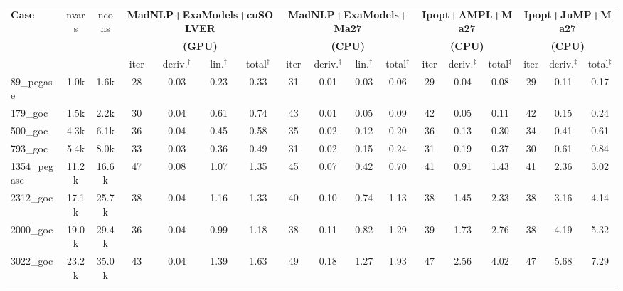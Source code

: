 \begin{tabular}{|l|c|c|cccc|cccc|ccc|ccc|}
  \hline
  \multirow{3}{*}{\textbf{Case}}
  & \multirow{3}{*}{nvars}
  & \multirow{3}{*}{ncons}
  & \multicolumn{4}{c|}{\textbf{MadNLP+ExaModels+cuSOLVER}}
  & \multicolumn{4}{c|}{\textbf{MadNLP+ExaModels+Ma27}}
  & \multicolumn{3}{c|}{\textbf{Ipopt+AMPL+Ma27}}
  & \multicolumn{3}{c|}{\textbf{Ipopt+JuMP+Ma27}}\\
  & & &\multicolumn{4}{c|}{\textbf{(GPU)}} &\multicolumn{4}{c|}{\textbf{(CPU)}} &\multicolumn{3}{c|}{\textbf{(CPU)}}&\multicolumn{3}{c|}{\textbf{(CPU)}}
  \\
  \cline{4-17}
  & & 
  & iter & deriv.$^\dag$ & lin.$^\dag$ & total$^\dag$
  & iter & deriv.$^\dag$ & lin.$^\dag$ & total$^\dag$
  & iter & deriv.$^\ddag$ & total$^\ddag$
  & iter & deriv.$^\ddag$ & total$^\ddag$
  \\
  \hline
89\_pegase 
&   1.0k
&   1.6k
& 28 
&  0.03
&  0.23
&  0.33
& 31 
&  0.01
&  0.03
&  0.06
& 29 
&  0.04
&  0.08
& 29 
&  0.11
&  0.17
\\

179\_goc 
&   1.5k
&   2.2k
& 30 
&  0.04
&  0.61
&  0.74
& 43 
&  0.01
&  0.05
&  0.09
& 42 
&  0.05
&  0.11
& 42 
&  0.15
&  0.24
\\

500\_goc 
&   4.3k
&   6.1k
& 36 
&  0.04
&  0.45
&  0.58
& 35 
&  0.02
&  0.12
&  0.20
& 36 
&  0.13
&  0.30
& 34 
&  0.41
&  0.61
\\

793\_goc 
&   5.4k
&   8.0k
& 33 
&  0.03
&  0.36
&  0.49
& 31 
&  0.02
&  0.15
&  0.24
& 31 
&  0.19
&  0.37
& 30 
&  0.61
&  0.84
\\

1354\_pegase 
&  11.2k
&  16.6k
& 47 
&  0.08
&  1.07
&  1.35
& 45 
&  0.07
&  0.42
&  0.70
& 41 
&  0.91
&  1.43
& 41 
&  2.36
&  3.02
\\
\hline
2312\_goc 
&  17.1k
&  25.7k
& 38 
&  0.04
&  1.16
&  1.33
& 40 
&  0.10
&  0.74
&  1.13
& 38 
&  1.45
&  2.33
& 38 
&  3.16
&  4.14
\\

2000\_goc 
&  19.0k
&  29.4k
& 36 
&  0.04
&  0.99
&  1.18
& 38 
&  0.11
&  0.82
&  1.29
& 39 
&  1.73
&  2.76
& 38 
&  4.19
&  5.32
\\

3022\_goc 
&  23.2k
&  35.0k
& 43 
&  0.04
&  1.39
&  1.63
& 49 
&  0.18
&  1.27
&  1.93
& 47 
&  2.56
&  4.02
& 47 
&  5.68
&  7.29
\\


\end{tabular}
